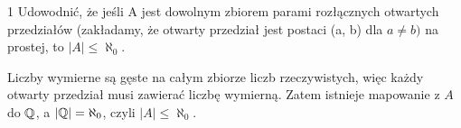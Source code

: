 \documentclass{../note}
\begin{document}
\begin{zadanie}{1}
Udowodnić, że jeśli A jest dowolnym zbiorem parami rozłącznych otwartych przedziałów (zakładamy, że otwarty przedział jest postaci (a, b) dla $a \ne b)$ na prostej, to $|A| \le \aleph_{0}$.
\end{zadanie}
\begin{rozwiazanie}
Liczby wymierne są gęste na całym zbiorze liczb rzeczywistych, więc każdy otwarty przedział musi zawierać liczbę wymierną. Zatem istnieje mapowanie z $A$ do $\mathbb{Q}$, a $|\mathbb{Q}| = \aleph_{0}$, czyli $|A| \le \aleph_{0}$.
\end{rozwiazanie}
\end{document}
